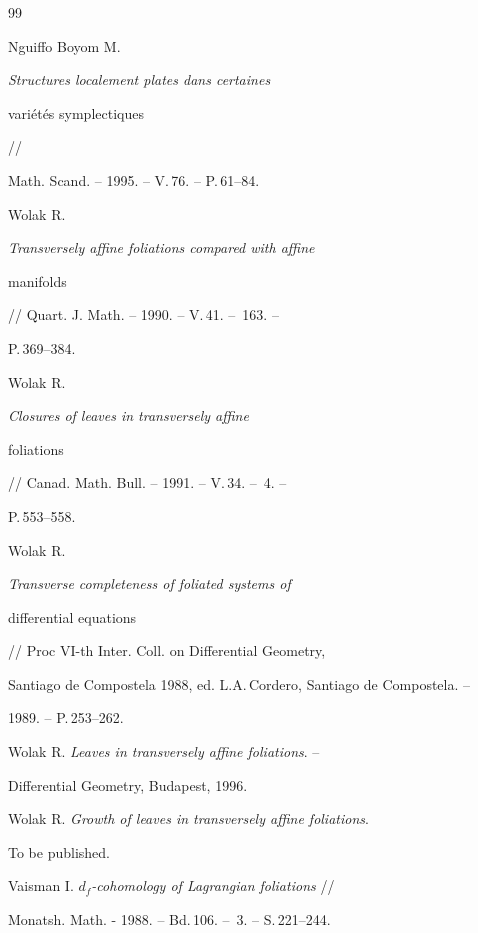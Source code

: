 \begin{thebibliography}{99}


Nguiffo Boyom M. {\em Structures localement plates dans certaines


vari\'et\'es symplectiques} //


Math. Scand. -- 1995. -- V.\,76. -- P.\,61--84.







Wolak R. {\em Transversely affine foliations compared with affine


manifolds} // Quart. J. Math. -- 1990. -- V.\,41. -- \No\,163. --


P.\,369--384.







Wolak R. {\em Closures of leaves in transversely affine


foliations} // Canad. Math. Bull. -- 1991. -- V.\,34. -- \No\,4. --


P.\,553--558.







Wolak R. {\em Transverse completeness of foliated systems of


differential equations} // Proc VI-th Inter. Coll. on Differential Geometry,


Santiago de Compostela 1988, ed. L.A.\,Cordero, Santiago de Compostela. --


1989. -- P.\,253--262.







Wolak R. {\em Leaves in transversely affine foliations}. --


Differential Geometry, Budapest, 1996.







Wolak R. {\em Growth of leaves in transversely affine foliations}.


To be published.







Vaisman I. {\em $d_f$-cohomology of Lagrangian foliations} //


Monatsh. Math. - 1988. -- Bd.\,106. -- \No\,3. -- S.\,221--244.






\end{thebibliography}
